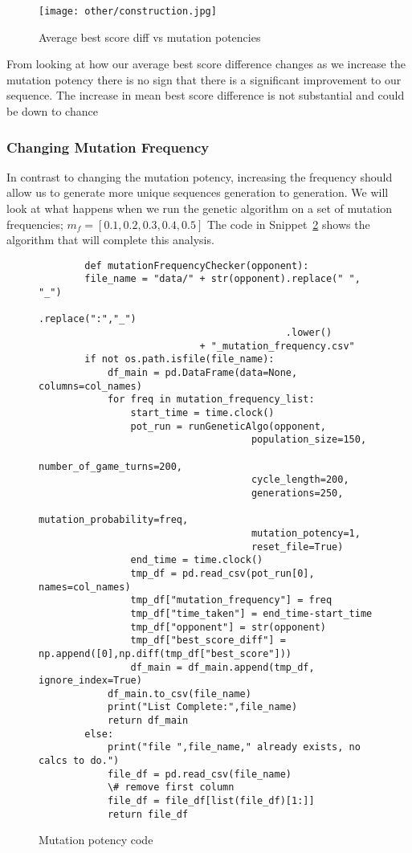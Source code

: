 \begin{figure}
    \texttt{[image: other/construction.jpg]}
    \caption{Average best score diff vs mutation potencies}\label{fig:MUT-POT-bs-diff-v-pot-all}
\end{figure}

From looking at how our average best score difference changes as we increase the mutation potency there is no sign that there is a significant improvement to our sequence. The increase in mean best score difference is not substantial and could be down to chance

\subsubsection{Changing Mutation Frequency}
In contrast to changing the mutation potency, increasing the frequency should allow us to generate more unique sequences generation to generation.
We will look at what happens when we run the genetic algorithm on a set of mutation frequencies; \(m_f = [0.1,0.2,0.3,0.4,0.5]\)
The code in Snippet~\ref{code:mutationFrequencyChecker} shows the algorithm that will complete this analysis.

\begin{figure}
    \begin{verbatim}
        def mutationFrequencyChecker(opponent):
        file_name = "data/" + str(opponent).replace(" ", "_")
                                           .replace(":","_")
                                           .lower()
                            + "_mutation_frequency.csv"
        if not os.path.isfile(file_name):
            df_main = pd.DataFrame(data=None, columns=col_names)  
            for freq in mutation_frequency_list:
                start_time = time.clock()
                pot_run = runGeneticAlgo(opponent,
                                     population_size=150,
                                     number_of_game_turns=200,
                                     cycle_length=200, 
                                     generations=250,
                                     mutation_probability=freq,
                                     mutation_potency=1,
                                     reset_file=True)
                end_time = time.clock()
                tmp_df = pd.read_csv(pot_run[0], names=col_names)
                tmp_df["mutation_frequency"] = freq
                tmp_df["time_taken"] = end_time-start_time
                tmp_df["opponent"] = str(opponent)
                tmp_df["best_score_diff"] = np.append([0],np.diff(tmp_df["best_score"]))
                df_main = df_main.append(tmp_df, ignore_index=True)
            df_main.to_csv(file_name)
            print("List Complete:",file_name)
            return df_main 
        else:
            print("file ",file_name," already exists, no calcs to do.")
            file_df = pd.read_csv(file_name) 
            \# remove first column
            file_df = file_df[list(file_df)[1:]]
            return file_df 
    \end{verbatim}
    \caption{Mutation potency code}\label{code:mutationFrequencyChecker}    
\end{figure}

